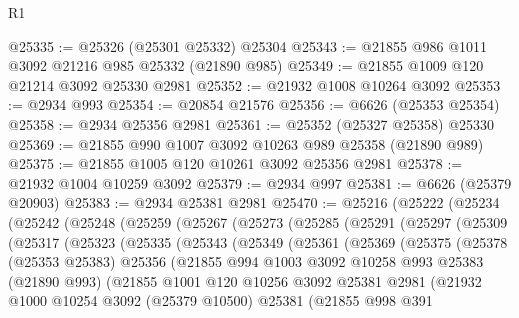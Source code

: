 \begin{lexlean}{R1}
\begin{coremodule}
@25335 := @25326 (@25301 @25332) @25304
@25343 := @21855 @986 @1011 @3092 @21216 @985 @25332 (@21890 @985)
@25349 := @21855 @1009 @120 @21214 @3092 @25330 @2981
@25352 := @21932 @1008 @10264 @3092
@25353 := @2934 @993
@25354 := @20854 @21576
@25356 := @6626 (@25353 @25354)
@25358 := @2934 @25356 @2981
@25361 := @25352 (@25327 @25358) @25330
@25369 := @21855 @990 @1007 @3092 @10263 @989 @25358 (@21890 @989)
@25375 := @21855 @1005 @120 @10261 @3092 @25356 @2981
@25378 := @21932 @1004 @10259 @3092
@25379 := @2934 @997
@25381 := @6626 (@25379 @20903)
@25383 := @2934 @25381 @2981
@25470 := @25216
    (@25222
      (@25234
        (@25242
          (@25248
            (@25259
              (@25267
                (@25273
                  (@25285
                    (@25291
                      (@25297
                        (@25309
                          (@25317
                            (@25323
                              (@25335
                                (@25343
                                  (@25349
                                    (@25361
                                      (@25369
                                        (@25375
                                          (@25378
                                            (@25353 @25383)
                                            @25356
                                            (@21855
                                              @994
                                              @1003
                                              @3092
                                              @10258
                                              @993
                                              @25383
                                              (@21890 @993)
                                              (@21855
                                                @1001
                                                @120
                                                @10256
                                                @3092
                                                @25381
                                                @2981
                                                (@21932
                                                  @1000
                                                  @10254
                                                  @3092
                                                  (@25379 @10500)
                                                  @25381
                                                  (@21855
                                                    @998
                                                    @391

\end{coremodule}
\end{lexlean}
